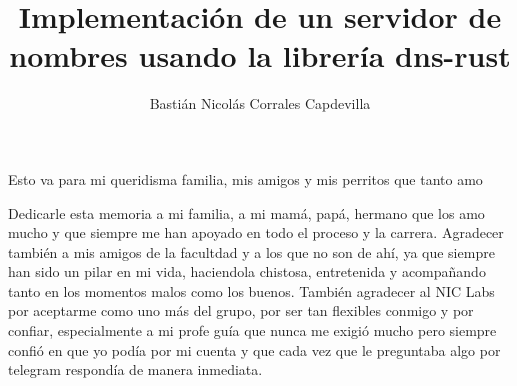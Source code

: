 \documentclass{umemoria}
\author{Bastián Nicolás Corrales Capdevilla}
\title{Implementación de un servidor de nombres usando la librería dns-rust}
\begin{document}
\frontmatter
\maketitle

\begin{dedicatoria}
Esto va para mi queridisma familia, mis amigos y mis perritos que tanto amo
\end{dedicatoria}

\begin{thanks}
Dedicarle esta memoria a mi familia, a mi mamá, papá, hermano que los amo mucho y que siempre me han apoyado en todo el proceso y la carrera.
Agradecer también a mis amigos de la facultdad y a los que no son de ahí, ya que siempre han sido un pilar en mi vida, haciendola chistosa, entretenida y acompañando
tanto en los momentos malos como los buenos. También agradecer al NIC Labs por aceptarme como uno más del grupo, por ser tan flexibles conmigo y por confiar,
especialmente a mi profe guía que nunca me exigió mucho pero siempre confió en que yo podía por mi cuenta y que cada vez que le preguntaba algo por telegram
respondía de manera inmediata.

\end{thanks}

\tableofcontents
\listoftables %
\listoffigures %

\mainmatter











\nocite{*}



\end{document}
